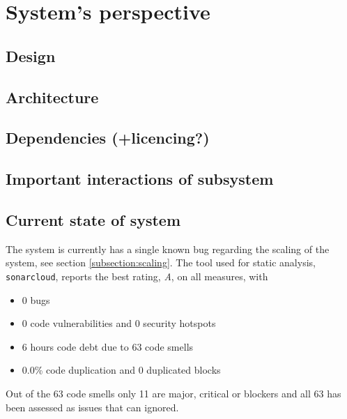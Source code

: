 \section{System's perspective} \label{section:System perspective}
\subsection{Design} %

\subsection{Architecture} %

\subsection{Dependencies (+licencing?) } %

\subsection{Important interactions of subsystem}

\subsection{Current state of system}
The system is currently has a single known bug regarding the scaling of the system, see section \ref{subsection:scaling}. The tool used for static analysis, \texttt{sonarcloud}, reports the best rating, \textit{A}, on all measures, with 

\begin{itemize}
    \item 0 bugs
    \item 0 code vulnerabilities and 0 security hotspots
    \item 6 hours code debt due to 63 code smells
    \item 0.0\% code duplication and 0 duplicated blocks
\end{itemize}

Out of the 63 code smells only 11 are major, critical or blockers and all 63 has been assessed as issues that can ignored.

